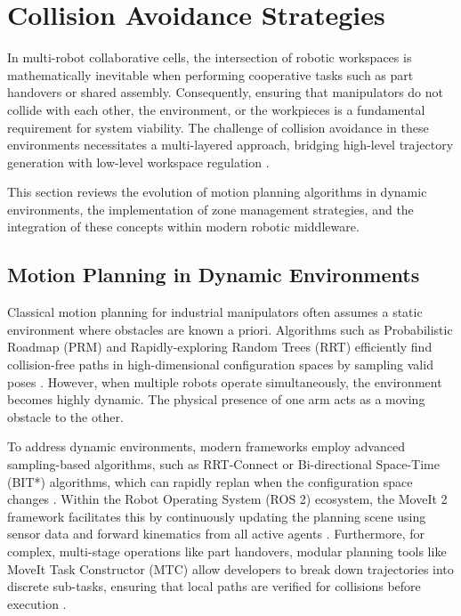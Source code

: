 \section{Collision Avoidance Strategies}

In multi-robot collaborative cells, the intersection of robotic workspaces is mathematically inevitable when performing cooperative tasks such as part handovers or shared assembly. Consequently, ensuring that manipulators do not collide with each other, the environment, or the workpieces is a fundamental requirement for system viability. The challenge of collision avoidance in these environments necessitates a multi-layered approach, bridging high-level trajectory generation with low-level workspace regulation \cite{khatib1986real}.

This section reviews the evolution of motion planning algorithms in dynamic environments, the implementation of zone management strategies, and the integration of these concepts within modern robotic middleware.

\subsection{Motion Planning in Dynamic Environments}

Classical motion planning for industrial manipulators often assumes a static environment where obstacles are known a priori. Algorithms such as Probabilistic Roadmap (PRM) and Rapidly-exploring Random Trees (RRT) efficiently find collision-free paths in high-dimensional configuration spaces by sampling valid poses \cite{lavalle2006planning}. However, when multiple robots operate simultaneously, the environment becomes highly dynamic. The physical presence of one arm acts as a moving obstacle to the other.

To address dynamic environments, modern frameworks employ advanced sampling-based algorithms, such as RRT-Connect or Bi-directional Space-Time (BIT*) algorithms, which can rapidly replan when the configuration space changes \cite{gammell2015batch}. Within the Robot Operating System (ROS 2) ecosystem, the MoveIt 2 framework facilitates this by continuously updating the planning scene using sensor data and forward kinematics from all active agents \cite{coleman2014reducing}. Furthermore, for complex, multi-stage operations like part handovers, modular planning tools like MoveIt Task Constructor (MTC) allow developers to break down trajectories into discrete sub-tasks, ensuring that local paths are verified for collisions before execution \cite{görner2019moveit}.


